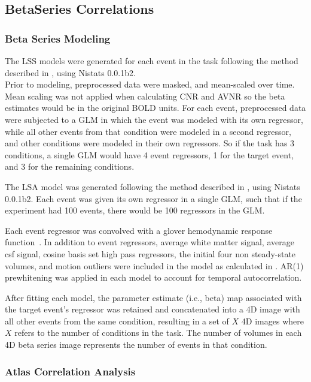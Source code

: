 \documentclass[10pt,letterpaper]{article}
\begin{document}
\subsection*{BetaSeries Correlations}
\label{methods:bsc}

\subsubsection*{Beta Series Modeling}
\label{methods:bsc_model}

The LSS models were generated for each event in
the task following the method described in \cite[Turner (2012)]{Turner2012a}, using
Nistats 0.0.1b2.\\
Prior to modeling, preprocessed data were masked, and mean-scaled over
time.
Mean scaling was not applied when calculating CNR and AVNR so the
beta estimates would be in the original BOLD units.
For each event, preprocessed data were subjected to a GLM
in which the event was modeled with its own regressor, while
all other events from that condition were modeled in a second regressor,
and other conditions were modeled in their own regressors.
So if the task has 3 conditions, 
a single GLM would have 4 event regressors, 1 for the target
event, and 3 for the remaining conditions.

The LSA model was generated following the method described in
\cite[Rissman (2004)]{Rissman2004}, using Nistats 0.0.1b2.
Each event was given its own regressor in a single GLM, such that
if the experiment had 100 events, there would be 100 regressors in the GLM.

Each event regressor was convolved with a glover hemodynamic response
function~\cite{Glover1999}.
In addition to event regressors, average white matter signal, average csf signal,
cosine basis set high pass regressors, the initial four non steady-state volumes, 
and motion outliers were included
in the model as calculated in .
AR(1) prewhitening was applied in each model to account
for temporal autocorrelation.

After fitting each model, the parameter estimate (i.e., beta) map
associated with the target event's regressor was retained and
concatenated into a 4D image with all other events from the same
condition, resulting in a set of $X$ 4D images where $X$ refers to the
number of conditions in the task.
The number of volumes in each 4D beta series image
represents the number of events in that condition.

\subsubsection*{Atlas Correlation Analysis}
\label{methods:atlas-corr-analysis}
\end{document}
